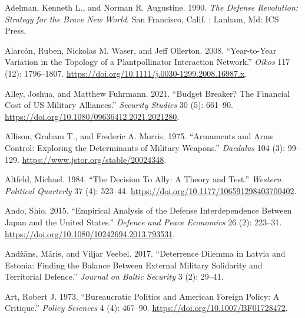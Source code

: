 \documentclass[
  12,
  letterpaper,
  DIV=11,
  numbers=noendperiod]{scrartcl}
\newlength{\cslhangindent}
\newlength{\cslentryspacingunit} %
\newenvironment{CSLReferences}[2] %
 {%
  \setlength{\parindent}{0pt}
  \ifodd #1
  \let\oldpar\par
  \def\par{\hangindent=\cslhangindent\oldpar}
  \fi
  \setlength{\parskip}{#2\cslentryspacingunit}
 }%
 {}
\begin{document}
\hypertarget{refs}{}
\begin{CSLReferences}{1}{0}
\leavevmode{}%
Adelman, Kenneth L., and Norman R. Augustine. 1990. \emph{The Defense
Revolution: Strategy for the Brave New World}. {San Francisco, Calif. :
Lanham, Md}: {ICS Press}.

\leavevmode{}%
Alarcón, Ruben, Nickolas M. Waser, and Jeff Ollerton. 2008.
{``Year-to-Year Variation in the Topology of a
Plant\textendash pollinator Interaction Network.''} \emph{Oikos} 117
(12): 1796--1807.
\url{https://doi.org/10.1111/j.0030-1299.2008.16987.x}.

\leavevmode{}%
Alley, Joshua, and Matthew Fuhrmann. 2021. {``Budget {Breaker}? {The
Financial Cost} of {US Military Alliances}.''} \emph{Security Studies}
30 (5): 661--90. \url{https://doi.org/10.1080/09636412.2021.2021280}.

\leavevmode{}%
Allison, Graham T., and Frederic A. Morris. 1975. {``Armaments and {Arms
Control}: {Exploring} the {Determinants} of {Military Weapons}.''}
\emph{Daedalus} 104 (3): 99--129.
\url{https://www.jstor.org/stable/20024348}.

\leavevmode{}%
Altfeld, Michael. 1984. {``The {Decision To Ally}: A {Theory} and
{Test}.''} \emph{Western Political Quarterly} 37 (4): 523--44.
\url{https://doi.org/10.1177/106591298403700402}.

\leavevmode{}%
Ando, Shio. 2015. {``Empirical Analysis of the Defense Interdependence
Between {Japan} and the {United States}.''} \emph{Defence and Peace
Economics} 26 (2): 223--31.
\url{https://doi.org/10.1080/10242694.2013.793531}.

\leavevmode{}%
Andžāns, Māris, and Viljar Veebel. 2017. {``Deterrence {Dilemma} in
{Latvia} and {Estonia}: {Finding} the {Balance} Between {External
Military Solidarity} and {Territorial Defence}.''} \emph{Journal on
Baltic Security} 3 (2): 29--41.

\leavevmode{}%
Art, Robert J. 1973. {``Bureaucratic Politics and {American} Foreign
Policy: {A} Critique.''} \emph{Policy Sciences} 4 (4): 467--90.
\url{https://doi.org/10.1007/BF01728472}.


\end{CSLReferences}
\end{document}
